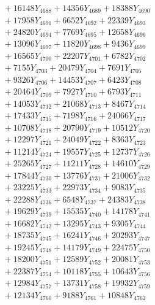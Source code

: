 \documentclass[a4paper,10pt]{article}
\begin{document}
{\begin{align}
&\;  + 16148 Y_{4688} + 14356 Y_{4689} + 18388 Y_{4690} \\[0.3ex]
&\;  + 17958 Y_{4691} + 6652 Y_{4692} + 22339 Y_{4693} \\[0.3ex]
&\;  + 24820 Y_{4694} + 7769 Y_{4695} + 12658 Y_{4696} \\[0.3ex]
&\;  + 13096 Y_{4697} + 11820 Y_{4698} + 9436 Y_{4699} \\[0.3ex]
&\;  + 16565 Y_{4700} + 22207 Y_{4701} + 6782 Y_{4702} \\[0.3ex]
&\;  + 7155 Y_{4703} + 20479 Y_{4704} + 7691 Y_{4705} \\[0.3ex]
&\;  + 9326 Y_{4706} + 14453 Y_{4707} + 6423 Y_{4708} \\[0.5ex]\allowbreak
&\;  + 20464 Y_{4709} + 7927 Y_{4710} + 6793 Y_{4711} \\[0.3ex]
&\;  + 14053 Y_{4712} + 21068 Y_{4713} + 8467 Y_{4714} \\[0.3ex]
&\;  + 17433 Y_{4715} + 7198 Y_{4716} + 24066 Y_{4717} \\[0.3ex]
&\;  + 10708 Y_{4718} + 20790 Y_{4719} + 10512 Y_{4720} \\[0.3ex]
&\;  + 12297 Y_{4721} + 24049 Y_{4722} + 8363 Y_{4723} \\[0.3ex]
&\;  + 11214 Y_{4724} + 19557 Y_{4725} + 12737 Y_{4726} \\[0.3ex]
&\;  + 25265 Y_{4727} + 11211 Y_{4728} + 14610 Y_{4729} \\[0.3ex]
&\;  + 17844 Y_{4730} + 13776 Y_{4731} + 21006 Y_{4732} \\[0.3ex]
&\;  + 23225 Y_{4733} + 22973 Y_{4734} + 9083 Y_{4735} \\[0.3ex]
&\;  + 22288 Y_{4736} + 6548 Y_{4737} + 24383 Y_{4738} \\[0.5ex]\allowbreak
&\;  + 19629 Y_{4739} + 15535 Y_{4740} + 14178 Y_{4741} \\[0.3ex]
&\;  + 16682 Y_{4742} + 13295 Y_{4743} + 9305 Y_{4744} \\[0.3ex]
&\;  + 18735 Y_{4745} + 16241 Y_{4746} + 20293 Y_{4747} \\[0.3ex]
&\;  + 19245 Y_{4748} + 14179 Y_{4749} + 22475 Y_{4750} \\[0.3ex]
&\;  + 18200 Y_{4751} + 12589 Y_{4752} + 20081 Y_{4753} \\[0.3ex]
&\;  + 22387 Y_{4754} + 10118 Y_{4755} + 10643 Y_{4756} \\[0.3ex]
&\;  + 12984 Y_{4757} + 13731 Y_{4758} + 19932 Y_{4759} \\[0.3ex]
&\;  + 12134 Y_{4760} + 9188 Y_{4761} + 10848 Y_{4762} \\[0.3ex]

\end{align}}
\end{document}
